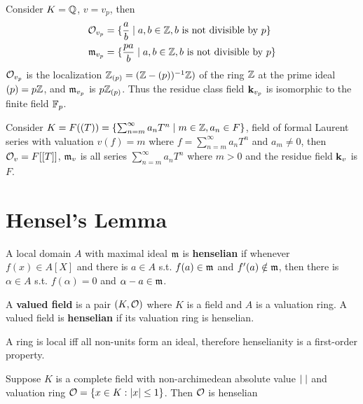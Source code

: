 \documentclass[11pt]{article}
\begin{document}
\begin{examplle}[]
Consider \(K=\mathbb{Q}\), \(v=v_p\), then
\begin{align*}
\mathcal{O}_{v_p}&=\{\frac{a}{b}\mid a,b\in\mathbb{Z},b\text{ is not divisible by }p\}\\
\mathfrak{m}_{v_p}&=\{\frac{pa}{b}\mid a,b\in\mathbb{Z},b\text{ is not divisible by }p\}
\end{align*}
\(\mathcal{O}_{v_p}\) is the localization \(\mathbb{Z}_{(p)}=(\mathbb{Z}-(p))^{-1}\mathbb{Z})\) of the ring \(\mathbb{Z}\) at the prime ideal \((p)=p\mathbb{Z}\),
and \(\mathfrak{m}_{v_p}\) is \(p\mathbb{Z}_{(p)}\). Thus the residue class field \(\operatorname{\textbf{k}}_{v_p}\) is isomorphic to
the finite field \(\mathbb{F}_p\).
\end{examplle}

\begin{examplle}[]
Consider \(K=F((T))=\{\sum_{n=m}^\infty a_nT^n\mid m\in\mathbb{Z},a_n\in F\}\), field of formal Laurent series with
valuation \(v(f)=m\) where \(f=\sum_{n=m}^\infty a_nT^n\) and \(a_m\neq 0\), then \(\mathcal{O}_{v}=F[[T]]\), \(\mathfrak{m}_v\) is all
series \(\sum_{n=m}^\infty a_nT^n\) where \(m>0\) and the residue field \(\operatorname{\textbf{k}}_v\) is \(F\).
\end{examplle}

\section{Hensel's Lemma}
\label{sec:org7402638}
\begin{definition}[]
A local domain \(A\) with maximal ideal \(\mathfrak{m}\) is \textbf{henselian} if whenever \(f(x)\in A[X]\) and there
is \(a\in A\) s.t. \(f(a)\in\mathfrak{m}\) and \(f'(a)\notin\mathfrak{m}\), then there is \(\alpha\in A\) s.t. \(f(\alpha)=0\)
and \(\alpha-a\in\mathfrak{m}\).

A \textbf{valued field} is a pair \((K,\mathcal{O})\) where \(K\) is a field and \(A\) is a valuation ring. A
valued field is \textbf{henselian} if its valuation ring is henselian.
\end{definition}

\begin{remark}
A ring is local iff all non-units form an ideal, therefore henselianity is a first-order property.
\end{remark}

\begin{theorem}
Suppose \(K\) is a complete field with non-archimedean absolute value \(\abs{\;}\) and valuation
ring \(\calo=\{x\in K:\abs{x}\le 1\}\). Then \(\mathcal{O}\) is henselian
\end{theorem}
\end{document}
